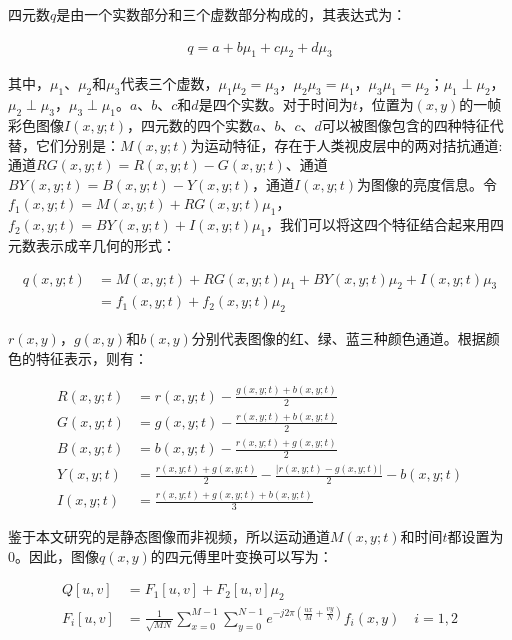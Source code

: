 四元数$q$是由一个实数部分和三个虚数部分构成的，其表达式为：
\begin{linenomath}
\begin{align}
q=a+b\mu_{1}+c\mu_{2}+d\mu_{3}
\label{式4_10}
\end{align}
\end{linenomath}
其中，$\mu_{1}$、$\mu_{2}$和$\mu_{3}$代表三个虚数，$\mu_{1}\mu_{2}=\mu_{3}$，$\mu_{2}\mu_{3}=\mu_{1}$，$\mu_{3}\mu_{1}=\mu_{2}$；$\mu_{1}\perp\mu_{2}$，$\mu_{2}\perp\mu_{3}$，$\mu_{3}\perp\mu_{1}$。$a$、$b$、$c$和$d$是四个实数。对于时间为$t$，位置为$(x,y)$的一帧彩色图像$I(x,y;t)$，四元数的四个实数$a$、$b$、$c$、$d$可以被图像包含的四种特征代替，它们分别是：$M(x,y;t)$为运动特征，存在于人类视皮层中的两对拮抗通道:通道$RG(x,y;t)=R(x,y;t)-G(x,y;t)$、通道$BY(x,y;t)=B(x,y;t)-Y(x,y;t)$，通道$I(x,y;t)$为图像的亮度信息。令$f_{1}(x,y;t)=M(x,y;t)+RG(x,y;t)\mu_{1}$，$f_{2}(x,y;t)=BY(x,y;t)+I(x,y;t)\mu_{1}$，我们可以将这四个特征结合起来用四元数表示成辛几何的形式：
\begin{linenomath}
\begin{align}
q(x,y;t) &= M(x,y;t)+RG(x,y;t)\mu_1+BY(x,y;t)\mu_2+I(x,y;t)\mu_3\nonumber\\
 &= f_1(x,y;t)+f_2(x,y;t)\mu_2
\label{式4_11}
\end{align}
\end{linenomath}
$r(x,y)$，$g(x,y)$和$b(x,y)$分别代表图像的红、绿、蓝三种颜色通道。根据颜色的特征表示，则有：
\begin{linenomath}
\begin{align}
R(x,y;t) &= r(x,y;t)-\frac{g(x,y;t)+b(x,y;t)}{2}\label{式4_12}\\
G(x,y;t) &= g(x,y;t)-\frac{r(x,y;t)+b(x,y;t)}{2}\label{式4_13}\\
B(x,y;t) &= b(x,y;t)-\frac{r(x,y;t)+g(x,y;t)}{2}\label{式4_14}\\
Y(x,y;t) &= \frac{r(x,y;t)+g(x,y;t)}{2}-\frac{\left|r(x,y;t)-g(x,y;t)\right|}{2}-b(x,y;t)\label{式4_15}\\
I(x,y;t) &= \frac{r(x,y;t)+g(x,y;t)+b(x,y;t)}{3}\label{式4_16}
\end{align}
\end{linenomath}
鉴于本文研究的是静态图像而非视频，所以运动通道$M(x,y;t)$和时间$t$都设置为0。因此，图像$q(x,y)$的四元傅里叶变换可以写为：
\begin{linenomath}
\begin{align}
Q[u,v] &= F_1[u,v]+F_2[u,v]\mu_2\label{式4_17}\\
F_i[u,v] &= \frac{1}{\sqrt{MN}}\sum_{x=0}^{M-1}\sum_{y=0}^{N-1}e^{-j 2\pi\left(\frac{ux}{M}+\frac{vy}{N}\right)}f_{i}(x,y)\quad i=1,2
\label{式4_18}
\end{align}
\end{linenomath}
